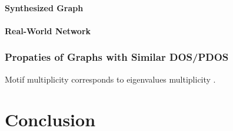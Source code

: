 \documentclass[senior,final,11pt]{iscs-thesis}
\begin{document}
\subsubsection{Synthesized Graph}
\subsubsection{Real-World Network}

\subsection{Propaties of Graphs with Similar DOS/PDOS}
Motif multiplicity corresponds to eigenvalues multiplicity \cite{mehatari2015effect,dong2019network}.


\chapter{Conclusion}




\appendix
\end{document}
